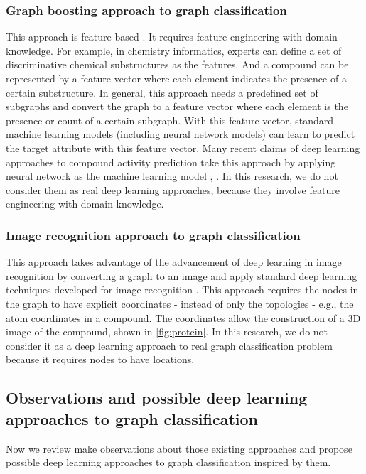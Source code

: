 \documentclass{article}
\begin{document}
\subsubsection{Graph boosting approach to graph classification}
This approach is feature based \cite{saigo2009gboost}.
It requires feature engineering with domain knowledge.
For example, in chemistry informatics, experts can define a set of discriminative chemical substructures as the features.
And a compound can be represented by a feature vector where each element indicates
the presence of a certain substructure.
In general, this approach needs a predefined set of subgraphs and convert the
graph to a feature vector where each element is the presence or count of a certain subgraph.
With this feature vector, standard machine learning models (including neural network models) can learn to predict the target attribute with this feature vector.
Many recent claims of deep learning approaches to compound activity prediction
take this approach by applying neural network as the machine learning model
\cite{unterthiner2015toxicity}, \cite{unterthiner2014deep} \cite{ramsundar2015massively}.
In this research, we do not consider them as real deep learning approaches,
because they involve feature engineering with domain knowledge.

\subsubsection{Image recognition approach to graph classification}
This approach takes advantage of the advancement of deep learning in image recognition by converting a graph to an image and apply standard deep learning techniques developed for image recognition \cite{wallach2015atomnet}.
This approach requires the nodes in the graph to have explicit coordinates -
instead of only the topologies - e.g., the atom coordinates in a compound.
The coordinates allow the construction of a 3D image of the compound,
shown in \autoref{fig:protein}.
In this research, we do not consider it as a deep learning approach to real
graph classification problem because it requires nodes to have locations.

\subsection{Observations and possible deep learning approaches to graph classification}
Now we review make observations about those existing approaches and
propose possible deep learning approaches to graph classification inspired by them.
\end{document}
